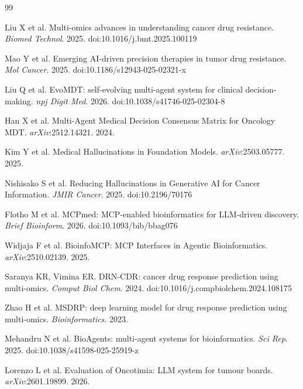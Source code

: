 \documentclass[12pt, letterpaper]{article}
\begin{document}
{\small
\begin{thebibliography}{99}
\setlength{\itemsep}{0pt}

 Liu X et al. Multi-omics advances in understanding cancer drug resistance. \textit{Biomed Technol}. 2025. doi:10.1016/j.bmt.2025.100119

 Mao Y et al. Emerging AI-driven precision therapies in tumor drug resistance. \textit{Mol Cancer}. 2025. doi:10.1186/s12943-025-02321-x

 Liu Q et al. EvoMDT: self-evolving multi-agent system for clinical decision-making. \textit{npj Digit Med}. 2026. doi:10.1038/s41746-025-02304-8

 Han X et al. Multi-Agent Medical Decision Consensus Matrix for Oncology MDT. \textit{arXiv}:2512.14321. 2024.

 Kim Y et al. Medical Hallucinations in Foundation Models. \textit{arXiv}:2503.05777. 2025.

 Nishisako S et al. Reducing Hallucinations in Generative AI for Cancer Information. \textit{JMIR Cancer}. 2025. doi:10.2196/70176

 Flotho M et al. MCPmed: MCP-enabled bioinformatics for LLM-driven discovery. \textit{Brief Bioinform}. 2026. doi:10.1093/bib/bbag076

 Widjaja F et al. BioinfoMCP: MCP Interfaces in Agentic Bioinformatics. \textit{arXiv}:2510.02139. 2025.

 Saranya KR, Vimina ER. DRN-CDR: cancer drug response prediction using multi-omics. \textit{Comput Biol Chem}. 2024. doi:10.1016/j.compbiolchem.2024.108175

 Zhao H et al. MSDRP: deep learning model for drug response prediction using multi-omics. \textit{Bioinformatics}. 2023.

 Mehandru N et al. BioAgents: multi-agent systems for bioinformatics. \textit{Sci Rep}. 2025. doi:10.1038/s41598-025-25919-z

 Lorenzo L et al. Evaluation of Oncotimia: LLM system for tumour boards. \textit{arXiv}:2601.19899. 2026.

\end{thebibliography}
}
\end{document}
